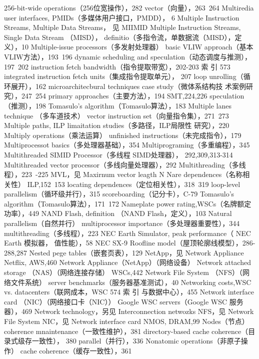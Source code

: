 256-bit-wide operations（256位宽操作），282
vector（向量），263~264
Multiredia user interfaces, PMIDs（多媒体用户接口，PMDD），
6
Multiple Instruction Streams, Multiple Data Streams， 见
MIIMID
Multiple Instruction Streams, Single Data Stream （MISD），
definitio（多指令流，单数据流（MISD），定义），10
Multiple-issue processors（多发射处理器）
basic VLIW approach（基本VLIW方法），193~196
dynamic scheduling and speculation（动态调度与推测），
197~202
instruction fetch bandwidth（指令提取带宽），202-203
索
引
573
integrated instruction fetch units（集成指令提取单元），
207
loop unrolling（循环展开），162
microarchitecbural techniques case study（微体系结构技
术案例研究），247~254
primary approaches（主要方法），194
SMT,224,226
speculation（推测），198
Tomasulo's algorithm（Tomasulo算法），183
Multiple lanes technique （多车道技术）
vector instruction set（向量指令集），271~273
Multiple paths, ILP limaitation studies（多路径，ILP局限性
研究），220
Multiply operations（乘法运算）
unfinished instructions（未完成指令），179
Multiprocessot basics（多处理器基础），354
Multiprograming（多重编程），345
Multithreaded SIMID Processor（多线程 SIMD处理器），
292,309,313-314
Multithreaded vector processor（多线向量处理器），292
Multithreading（多线程），223~-225
MVL，见 Maxirnum vector leagth
N
Nare dependences（名称相关性）
ILP,152~153
locating dependences（定位相关性），318~319
loop-level parallelism（循环级并行），315
scoreboarding（记分卡），C-79
Tomasulo's algorithm（Tomasulo算法），171~172
Nameplate power rating,WSCs（名牌额定功率），449
NAND Flash, definition （NAND Flash，定义），103
Natural parallelism（自然并行）
multiprocessor importance（多处理器重要性），344
multithreading（多线程），223
NEC Earth Simulator, peak performance（ NEC Earth 模拟器，
值性能），58
NEC SX-9
Roofline model（屋顶轮廓线模型），286-288,287
Nested pege tables（嵌套页表），129
NetApp，见 Network Appliance
Netflix, AWS,460
Network Appliance（NetApp）（网络设备）
Network attached storage （NAS）（网络连接存储）
WSCs,442
Network File System （NFS）（网络文件系统）
server benchmarks（服务器基准测试），40
Networking costs,WSC vs. datacenters（联网成本，WSC
574
索
引
与数据中心），455
Network interface card （NIC）（网络接口卡（NIC））
Google WSC servers（Google WSC 服务器），469
Network technology，另见 Interconnection netwozks
NFS，见 Network File System
NIC，见 Network interface card
NMOS, DRAM,99
Nodes（节点）
coherence mnaintenance（一致性维护），381
directory-based cache coherence（目录式级存一致性），
380
parallel（并行），336
Nonatomic operations（非原子操作）
cache coherence（缓存一致性），361

